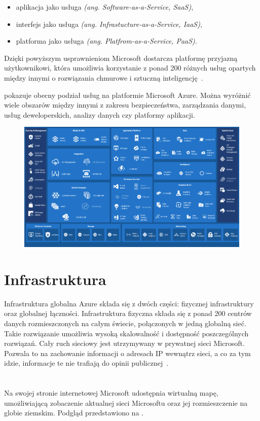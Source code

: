 \begin{itemize}
    \item aplikacja jako usługa \textit{(ang. Software-as-a-Service, SaaS)},
    \item interfejs jako usługa \textit{(ang. Infrastucture-as-a-Service, IaaS)},
    \item platforma jako usługa \textit{(ang. Platfrom-as-a-Service, PaaS)}.
\end{itemize}
Dzięki powyższym usprawnieniom Microsoft dostarcza platformę przyjazną użytkownikowi, która umożliwia korzystanie z ponad 200 różnych usług opartych między innymi o rozwiązania chmurowe i sztuczną inteligencję~\cite{Roosevelt2022, MicrosoftAzurec, Datashift}.

\vfill
\pagebreak

 pokazuje obecny podział usług na platformie Microsoft Azure. Można wyróżnić wiele obszarów między innymi z zakresu bezpieczeństwa, zarządzania danymi, usług deweloperskich, analizy danych czy platformy aplikacji.

\begin{figure}[H]
    \includegraphics[width=\textwidth]{images/ms_azure}
    \label{fig:ms-azure}
\end{figure}

\section{Infrastruktura}
Infrastruktura globalna Azure składa się z dwóch części: fizycznej infrastruktury oraz globalnej łączności. Infrastruktura fizyczna składa się z ponad 200 centrów danych rozmieszczonych na całym świecie, połączonych w jedną globalną sieć. Takie rozwiązanie umożliwia wysoką skalowalność i dostępność poszczególnych rozwiązań. Cały ruch sieciowy jest utrzymywany w prywatnej sieci Microsoft. Pozwala to na zachowanie informacji o adresach IP wewnątrz sieci, a co za tym idzie, informacje te nie trafiają do opinii publicznej~\cite{MicrosoftAzureb}.\\
\\ \\
Na swojej stronie internetowej Microsoft udostępnia wirtualną mapę, umożliwiającą zobaczenie aktualnej sieci Microsoftu oraz jej rozmieszczenie na globie ziemskim. Podgląd przedstawiono na .


